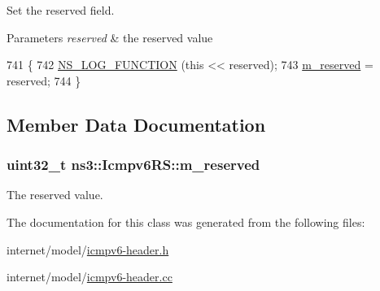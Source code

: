 Set the reserved field. 


\begin{DoxyParams}{Parameters}
{\em reserved} & the reserved value \\
\hline
\end{DoxyParams}

\begin{DoxyCode}
741 \{
742   \hyperlink{log-macros-disabled_8h_a90b90d5bad1f39cb1b64923ea94c0761}{NS\_LOG\_FUNCTION} (\textcolor{keyword}{this} << reserved);
743   \hyperlink{classns3_1_1Icmpv6RS_a860127991ad207f66247e907a2164e73}{m\_reserved} = reserved;
744 \}
\end{DoxyCode}


\subsection{Member Data Documentation}
\subsubsection[{\texorpdfstring{m\+\_\+reserved}{m_reserved}}]{\setlength{\rightskip}{0pt plus 5cm}uint32\+\_\+t ns3\+::\+Icmpv6\+R\+S\+::m\+\_\+reserved\hspace{0.3cm}{\ttfamily [private]}}\hypertarget{classns3_1_1Icmpv6RS_a860127991ad207f66247e907a2164e73}{}\label{classns3_1_1Icmpv6RS_a860127991ad207f66247e907a2164e73}


The reserved value. 



The documentation for this class was generated from the following files\+:\begin{DoxyCompactItemize}
\item 
internet/model/\hyperlink{icmpv6-header_8h}{icmpv6-\/header.\+h}\item 
internet/model/\hyperlink{icmpv6-header_8cc}{icmpv6-\/header.\+cc}\end{DoxyCompactItemize}
